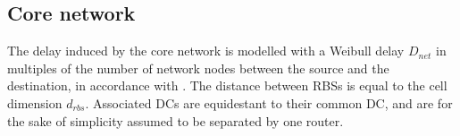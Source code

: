 \subsection{Core network}
The delay induced by the core network is modelled with a Weibull delay $D_{net}$ in multiples of the number of network nodes between the source and the destination, in accordance with \cite{papagiannaki2003measurement}. The distance between \ac{RBS}s is equal to the cell dimension $d_{rbs}$. Associated \ac{DC}s are equidestant to their common \ac{DC}, and are for the sake of simplicity assumed to be separated by one router.
